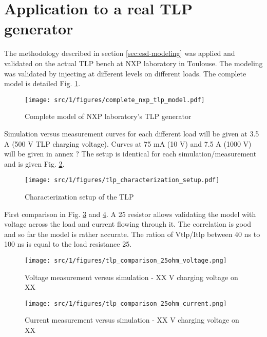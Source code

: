 \section{Application to a real TLP generator}
\label{sec:tlp-modeling}

The methodology described in section \ref{sec:esd-modeling} was applied and validated on the actual TLP bench at NXP laboratory in Toulouse.
The modeling was validated by injecting at different levels on different loads.
The complete model is detailed Fig. \ref{fig:complete-tlp-model}.


\begin{figure}[!h]
  \centering
  \texttt{[image: src/1/figures/complete\_nxp\_tlp\_model.pdf]}
  \caption{Complete model of NXP laboratory's TLP generator}
  \label{fig:complete-tlp-model}
\end{figure}

Simulation versus measurement curves for each different load will be given at 3.5 A (500 V TLP charging voltage).
Curves at 75 mA (10 V) and 7.5 A (1000 V) will be given in annex ?
The setup is identical for each simulation/measurement and is given Fig. \ref{fig:setup-cz-tlp-model}.

\begin{figure}[!h]
  \centering
  \texttt{[image: src/1/figures/tlp\_characterization\_setup.pdf]}
  \caption{Characterization setup of the TLP}
  \label{fig:setup-cz-tlp-model}
\end{figure}

First comparison in Fig. \ref{fig:comparison-tlp-1-v} and \ref{fig:comparison-tlp-1-i}.
A 25\textOmega{} resistor allows validating the model with voltage across the load and current flowing through it. The correlation is good and so far the model is rather accurate. The ration of Vtlp/Itlp between 40 ns to 100 ns is equal to the load resistance 25\textOmega{}.


\begin{figure}[!h]
  \centering
  \texttt{[image: src/1/figures/tlp\_comparison\_25ohm\_voltage.png]}
  \caption{Voltage measurement versus simulation - XX V charging voltage on XX\textOmega{}}
  \label{fig:comparison-tlp-1-v}
\end{figure}

\begin{figure}[!h]
  \centering
  \texttt{[image: src/1/figures/tlp\_comparison\_25ohm\_current.png]}
  \caption{Current measurement versus simulation - XX V charging voltage on XX\textOmega{}}
  \label{fig:comparison-tlp-1-i}
\end{figure}

